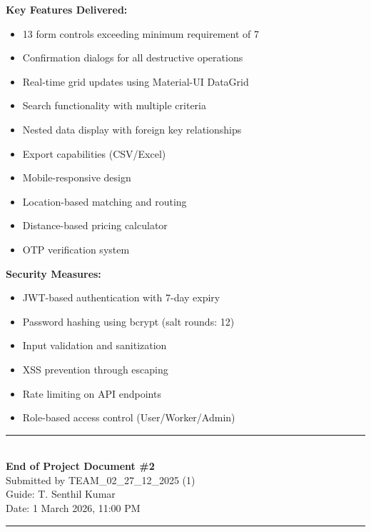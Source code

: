 \documentclass[12pt,a4paper]{article}
\begin{document}
\begin{table}[H]
{\begin{minipage}{0.95\textwidth}
\textbf{Key Features Delivered:}
\begin{itemize}
\item 13 form controls exceeding minimum requirement of 7
\item Confirmation dialogs for all destructive operations
\item Real-time grid updates using Material-UI DataGrid
\item Search functionality with multiple criteria
\item Nested data display with foreign key relationships
\item Export capabilities (CSV/Excel)
\item Mobile-responsive design
\item Location-based matching and routing
\item Distance-based pricing calculator
\item OTP verification system
\end{itemize}

\textbf{Security Measures:}
\begin{itemize}
\item JWT-based authentication with 7-day expiry
\item Password hashing using bcrypt (salt rounds: 12)
\item Input validation and sanitization
\item XSS prevention through escaping
\item Rate limiting on API endpoints
\item Role-based access control (User/Worker/Admin)
\end{itemize}

\vspace{0.3cm}
\end{minipage}}
\end{table}

\vfill
\begin{center}
\rule{0.8\textwidth}{0.4pt}\\[0.3cm]
{\Large\textbf{End of Project Document \#2}}\\[0.2cm]
{\small Submitted by TEAM\_02\_27\_12\_2025 (1)}\\
{\small Guide: T. Senthil Kumar}\\
{\small Date: 1 March 2026, 11:00 PM}\\[0.2cm]
\rule{0.8\textwidth}{0.4pt}
\end{center}
\end{document}
